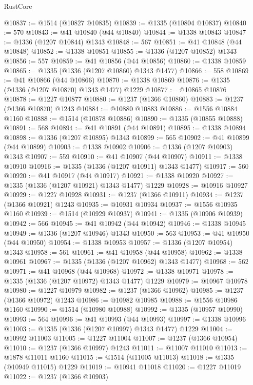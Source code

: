 \begin{lexlean}{RustCore}
\begin{coremodule}
@10837 := @1514 (@10827 @10835)
@10839 := @1335 (@10804 @10837)
@10840 := 570
@10843 := @41 @10840 (@44 @10840)
@10844 := @1338 @10843
@10847 := @1336 (@1207 @10844) @1343
@10848 := 567
@10851 := @41 @10848 (@44 @10848)
@10852 := @1338 @10851
@10855 := @1336 (@1207 @10852) @1343
@10856 := 557
@10859 := @41 @10856 (@44 @10856)
@10860 := @1338 @10859
@10865 := @1335 (@1336 (@1207 @10860) @1343 @1477)
@10866 := 558
@10869 := @41 @10866 (@44 @10866)
@10870 := @1338 @10869
@10876 := @1335 (@1336 (@1207 @10870) @1343 @1477) @1229
@10877 := @10865 @10876
@10878 := @1227 @10877
@10880 := @1237 (@1366 @10860)
@10883 := @1237 (@1366 @10870) @1243
@10884 := @10880 @10883
@10886 := @1556 @10884 @1160
@10888 := @1514 (@10878 @10886)
@10890 := @1335 (@10855 @10888)
@10891 := 568
@10894 := @41 @10891 (@44 @10891)
@10895 := @1338 @10894
@10898 := @1336 (@1207 @10895) @1343
@10899 := 565
@10902 := @41 @10899 (@44 @10899)
@10903 := @1338 @10902
@10906 := @1336 (@1207 @10903) @1343
@10907 := 559
@10910 := @41 @10907 (@44 @10907)
@10911 := @1338 @10910
@10916 := @1335 (@1336 (@1207 @10911) @1343 @1477)
@10917 := 560
@10920 := @41 @10917 (@44 @10917)
@10921 := @1338 @10920
@10927 := @1335 (@1336 (@1207 @10921) @1343 @1477) @1229
@10928 := @10916 @10927
@10929 := @1227 @10928
@10931 := @1237 (@1366 @10911)
@10934 := @1237 (@1366 @10921) @1243
@10935 := @10931 @10934
@10937 := @1556 @10935 @1160
@10939 := @1514 (@10929 @10937)
@10941 := @1335 (@10906 @10939)
@10942 := 566
@10945 := @41 @10942 (@44 @10942)
@10946 := @1338 @10945
@10949 := @1336 (@1207 @10946) @1343
@10950 := 563
@10953 := @41 @10950 (@44 @10950)
@10954 := @1338 @10953
@10957 := @1336 (@1207 @10954) @1343
@10958 := 561
@10961 := @41 @10958 (@44 @10958)
@10962 := @1338 @10961
@10967 := @1335 (@1336 (@1207 @10962) @1343 @1477)
@10968 := 562
@10971 := @41 @10968 (@44 @10968)
@10972 := @1338 @10971
@10978 := @1335 (@1336 (@1207 @10972) @1343 @1477) @1229
@10979 := @10967 @10978
@10980 := @1227 @10979
@10982 := @1237 (@1366 @10962)
@10985 := @1237 (@1366 @10972) @1243
@10986 := @10982 @10985
@10988 := @1556 @10986 @1160
@10990 := @1514 (@10980 @10988)
@10992 := @1335 (@10957 @10990)
@10993 := 564
@10996 := @41 @10993 (@44 @10993)
@10997 := @1338 @10996
@11003 := @1335 (@1336 (@1207 @10997) @1343 @1477) @1229
@11004 := @10992 @11003
@11005 := @1227 @11004
@11007 := @1237 (@1366 @10954)
@11010 := @1237 (@1366 @10997) @1243
@11011 := @11007 @11010
@11013 := @1878 @11011 @1160
@11015 := @1514 (@11005 @11013)
@11018 := @1335 (@10949 @11015) @1229
@11019 := @10941 @11018
@11020 := @1227 @11019
@11022 := @1237 (@1366 @10903)

\end{coremodule}
\end{lexlean}
